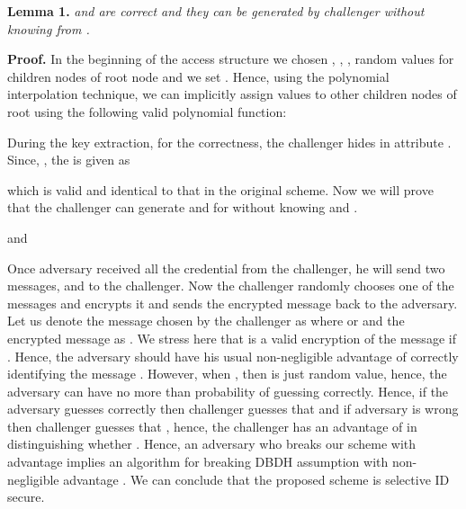 \documentclass[10pt,journal]{IEEEtran}
\begin{document}
\noindent \textbf{Lemma 1.} \emph{ and  are correct and they can be generated by challenger without knowing  from .}

\noindent \textbf{Proof.}
In the beginning of the access structure we chosen , , ,  random values for children nodes of root node and we set . Hence, using the polynomial interpolation technique, we can implicitly assign values to other children nodes of root using the following valid polynomial function:

During the key extraction, for the correctness, the challenger hides  in attribute . Since, , the    is given as

which is valid and identical to that in the original scheme. Now we will prove that the challenger can generate  and  for  without knowing  and .

and

Once adversary received all the credential from the challenger, he will send two messages,  and  to the challenger. Now the challenger randomly chooses one of the messages  and encrypts it and sends the encrypted message back to the adversary. Let us denote the message chosen by the challenger as  where  or  and the encrypted message as . We stress here that  is a valid encryption of the message  if . Hence, the adversary should have his usual non-negligible advantage  of correctly identifying the message . However, when , then  is just random value, hence, the adversary can have no more than  probability of guessing correctly. Hence, if the adversary guesses correctly then challenger guesses that   and if adversary is wrong then challenger guesses that , hence, the challenger has an advantage of  in distinguishing whether . Hence, an adversary who breaks our scheme with advantage  implies an algorithm for breaking DBDH assumption with non-negligible advantage . We can conclude that the proposed scheme is selective ID secure.\\
\end{document}
